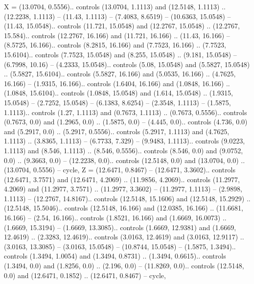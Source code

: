 {X} = {(13.0704, 0.5556).. controls (13.0704, 1.1113) and (12.5148, 1.1113) .. (12.2238, 1.1113) -- (11.43, 1.1113) -- (7.4083, 8.6519) -- (10.6363, 15.0548) -- (11.43, 15.0548).. controls (11.721, 15.0548) and (12.2767, 15.0548) .. (12.2767, 15.584).. controls (12.2767, 16.166) and (11.721, 16.166) .. (11.43, 16.166) -- (8.5725, 16.166).. controls (8.2815, 16.166) and (7.7523, 16.166) .. (7.7523, 15.6104).. controls (7.7523, 15.0548) and (8.255, 15.0548) .. (9.181, 15.0548) -- (6.7998, 10.16) -- (4.2333, 15.0548).. controls (5.08, 15.0548) and (5.5827, 15.0548) .. (5.5827, 15.6104).. controls (5.5827, 16.166) and (5.0535, 16.166) .. (4.7625, 16.166) -- (1.9315, 16.166).. controls (1.6404, 16.166) and (1.0848, 16.166) .. (1.0848, 15.6104).. controls (1.0848, 15.0548) and (1.614, 15.0548) .. (1.9315, 15.0548) -- (2.7252, 15.0548) -- (6.1383, 8.6254) -- (2.3548, 1.1113) -- (1.5875, 1.1113).. controls (1.27, 1.1113) and (0.7673, 1.1113) .. (0.7673, 0.5556).. controls (0.7673, 0.0) and (1.2965, 0.0) .. (1.5875, 0.0) -- (4.445, 0.0).. controls (4.736, 0.0) and (5.2917, 0.0) .. (5.2917, 0.5556).. controls (5.2917, 1.1113) and (4.7625, 1.1113) .. (3.8365, 1.1113) -- (6.7733, 7.329) -- (9.9483, 1.1113).. controls (9.0223, 1.1113) and (8.546, 1.1113) .. (8.546, 0.5556).. controls (8.546, 0.0) and (9.0752, 0.0) .. (9.3663, 0.0) -- (12.2238, 0.0).. controls (12.5148, 0.0) and (13.0704, 0.0) .. (13.0704, 0.5556) -- cycle},
{Z} = {(12.6471, 0.8467) -- (12.6471, 3.3602).. controls (12.6471, 3.7571) and (12.6471, 4.2069) .. (11.9856, 4.2069).. controls (11.2977, 4.2069) and (11.2977, 3.7571) .. (11.2977, 3.3602) -- (11.2977, 1.1113) -- (2.9898, 1.1113) -- (12.2767, 14.8167).. controls (12.5148, 15.1606) and (12.5148, 15.2929) .. (12.5148, 15.5046).. controls (12.5148, 16.166) and (12.0385, 16.166) .. (11.6681, 16.166) -- (2.54, 16.166).. controls (1.8521, 16.166) and (1.6669, 16.0073) .. (1.6669, 15.3194) -- (1.6669, 13.3085).. controls (1.6669, 12.9381) and (1.6669, 12.4619) .. (2.3283, 12.4619).. controls (3.0163, 12.4619) and (3.0163, 12.9117) .. (3.0163, 13.3085) -- (3.0163, 15.0548) -- (10.8744, 15.0548) -- (1.5875, 1.3494).. controls (1.3494, 1.0054) and (1.3494, 0.8731) .. (1.3494, 0.6615).. controls (1.3494, 0.0) and (1.8256, 0.0) .. (2.196, 0.0) -- (11.8269, 0.0).. controls (12.5148, 0.0) and (12.6471, 0.1852) .. (12.6471, 0.8467) -- cycle},
